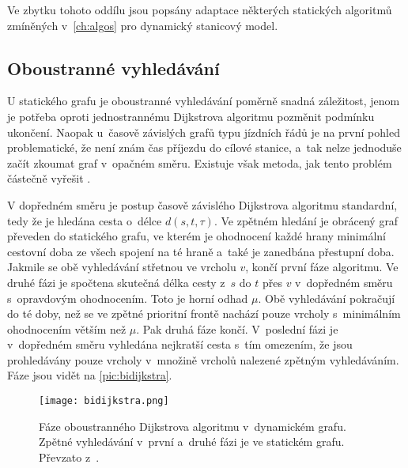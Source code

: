 Ve zbytku tohoto oddílu jsou popsány adaptace některých statických algoritmů zmíněných v~\autoref{ch:algos} pro dynamický stanicový model.

\subsection{Oboustranné vyhledávání}
U statického grafu je oboustranné vyhledávání poměrně snadná záležitost, jenom je potřeba oproti jednostrannému Dijkstrova algoritmu pozměnit podmínku ukončení. Naopak u~časově závislých grafů typu jízdních řádů je na první pohled problematické, že není znám čas příjezdu do cílové stanice, a~tak nelze jednoduše začít zkoumat graf v~opačném směru. Existuje však metoda, jak tento problém částečně vyřešit \cite{NanniciniBiDiA}.

\renewcommand{\figureautorefname}{obrázku}
V dopředném směru je postup časově závislého Dijkstrova algoritmu standardní, tedy že je hledána cesta o~délce $d(s,t,\tau)$. Ve zpětném hledání je obrácený graf převeden do statického grafu, ve kterém je ohodnocení každé hrany minimální cestovní doba ze všech spojení na té hraně a~také je zanedbána přestupní doba. Jakmile se obě vyhledávání střetnou ve vrcholu $v$, končí první fáze algoritmu. Ve druhé fázi je spočtena skutečná délka cesty z~$s$ do $t$ přes $v$ v~dopředném směru s~opravdovým ohodnocením. Toto je horní odhad $\mu$. Obě vyhledávání pokračují do té doby, než se ve zpětné prioritní frontě nachází pouze vrcholy s~minimálním ohodnocením větším než $\mu$. Pak druhá fáze končí. V~poslední fázi je v~dopředném směru vyhledána nejkratší cesta s~tím omezením, že jsou prohledávány pouze vrcholy v~množině vrcholů nalezené zpětným vyhledáváním. Fáze jsou vidět na \autoref{pic:bidijkstra}.
\renewcommand{\figureautorefname}{obrázek}

\begin{figure}[htbp]
	\centering
	\texttt{[image: bidijkstra.png]}
	\caption[Fáze oboustranného Dijkstrova algoritmu v~dynamickém grafu.]{Fáze oboustranného Dijkstrova algoritmu v~dynamickém grafu. Zpětné vyhledávání v~první a~druhé fázi je ve statickém grafu. Převzato z~\cite{NanniciniRoadNetw}.}
	\label{pic:bidijkstra}
\end{figure}

\renewcommand{\sectionautorefname}{oddíle}
